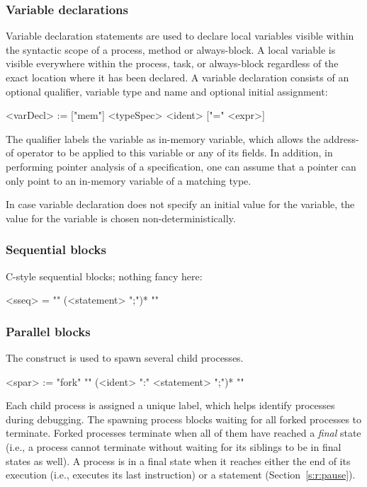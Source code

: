 \subsubsection{Variable declarations}\label{s:r:localvar}

Variable declaration statements are used to declare local 
variables visible within the syntactic scope of a process, method 
or always-block.  A local variable is visible everywhere within 
the process, task, or always-block regardless of the exact 
location where it has been declared.  A variable declaration 
consists of an optional  qualifier, variable type and 
name and optional initial assignment:
\begin{bnflisting}
<varDecl> := ["mem"] <typeSpec> <ident> ["=" <expr>]
\end{bnflisting}
The  qualifier labels the variable as in-memory variable,
which allows the address-of operator to be applied to this 
variable or any of its fields.  In addition, in performing pointer 
analysis of a \tsl specification, one can assume that a pointer 
can only point to an in-memory variable of a matching type.

In case variable declaration does not specify an initial value for 
the variable, the value for the variable is chosen 
non-deterministically.

\subsubsection{Sequential blocks} 

C-style sequential blocks; nothing fancy here:
\begin{bnflisting}
<sseq> = "{" (<statement> ";")* "}"
\end{bnflisting}

\subsubsection{Parallel blocks}\label{s:r:fork}

The  construct is used to spawn several child processes.  
\begin{bnflisting}
<spar> := "fork" "{" 
               (<ident> ":" <statement> ";")*
          "}"
\end{bnflisting}
Each child process is assigned a unique label, which helps 
identify processes during debugging.  The spawning process blocks 
waiting for all forked processes to terminate.  Forked processes 
terminate when all of them have reached a \emph{final} state 
(i.e., a process cannot terminate without waiting for its siblings 
to be in final states as well).  A process is in a final state 
when it reaches either the end of its execution (i.e., executes 
its last instruction) or a  statement 
(Section~\ref{s:r:pause}).  

